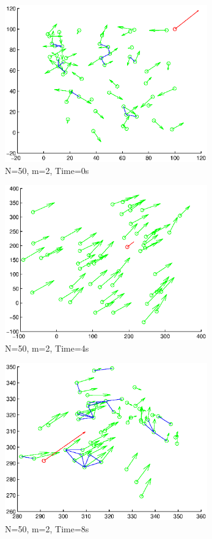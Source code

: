 \documentclass[10pt, conference]{IEEEtran}
\begin{document}
\clearpage

\begin{figure}[!p]
  \begin{center}
    \includegraphics[width=3.45in]{n50m2t00}
  \end{center}

  \caption{\small N=50, m=2, Time=0s}
  \label{fig:n50m2t00}
\end{figure}

\begin{figure}[!p]
  \begin{center}
    \includegraphics[width=3.45in]{n50m2t04}
  \end{center}

  \caption{\small N=50, m=2, Time=4s}
  \label{fig:n50m2t04}
\end{figure}

\begin{figure}[!p]
  \begin{center}
    \includegraphics[width=3.45in]{n50m2t08}
  \end{center}

  \caption{\small N=50, m=2, Time=8s}
  \label{fig:n50m2t08}
\end{figure}
\end{document}
